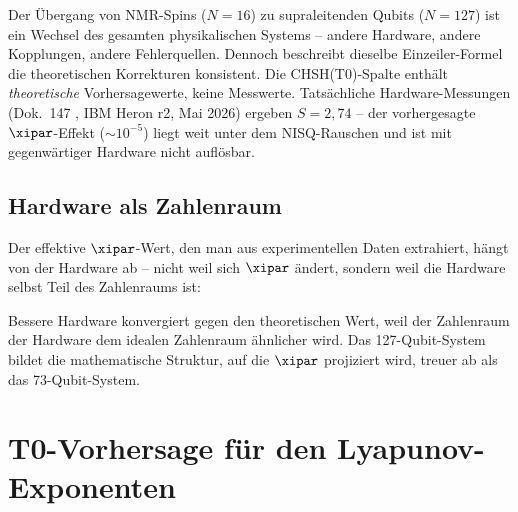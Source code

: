 \begin{keyresult}
	Der Übergang von NMR-Spins ($N=16$) zu supraleitenden Qubits ($N=127$) ist ein Wechsel des gesamten physikalischen Systems -- andere Hardware, andere Kopplungen, andere Fehlerquellen. Dennoch beschreibt dieselbe Einzeiler-Formel die theoretischen Korrekturen konsistent. Die CHSH(T0)-Spalte enthält \emph{theoretische} Vorhersagewerte, keine Messwerte. Tatsächliche Hardware-Messungen (Dok.~147 \cite{pascher_quantum_computing_2025}, IBM Heron r2, Mai 2026) ergeben $S = 2{,}74$ -- der vorhergesagte $\xipar$-Effekt ($\sim 10^{-5}$) liegt weit unter dem NISQ-Rauschen und ist mit gegenwärtiger Hardware nicht auflösbar.
\end{keyresult}

\subsection{Hardware als Zahlenraum}

Der effektive $\xipar$-Wert, den man aus experimentellen Daten extrahiert, hängt von der Hardware ab -- nicht weil sich $\xipar$ ändert, sondern weil die Hardware selbst Teil des Zahlenraums ist:

\begin{table}[h]
	\centering
	\caption{$\xipar$-Extraktion: Hardware-Konvergenz zum theoretischen Wert}
	\label{tab:xi_convergence}
\end{table}

Bessere Hardware konvergiert gegen den theoretischen Wert, weil der Zahlenraum der Hardware dem idealen Zahlenraum ähnlicher wird. Das 127-Qubit-System bildet die mathematische Struktur, auf die $\xipar$ projiziert wird, treuer ab als das 73-Qubit-System.


\section{T0-Vorhersage für den Lyapunov-Exponenten}
\label{sec:lyapunov}

